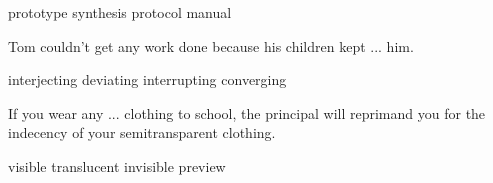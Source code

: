 \documentclass{exam}
\begin{document}
\begin{questions}
\begin{oneparchoices}
\correctchoice prototype
\choice synthesis
\choice protocol
\choice manual
\end{oneparchoices}
\question Tom couldn't get any work done because his children kept ... him.\\
\begin{oneparchoices}
\choice interjecting
\choice deviating
\correctchoice interrupting
\choice converging
\end{oneparchoices}
\question If you wear any ... clothing to school, the principal will reprimand you for the indecency of your semitransparent clothing.\\
\begin{oneparchoices}
\choice visible
\correctchoice translucent
\choice invisible
\choice preview
\end{oneparchoices}
\end{questions}
\end{document}
